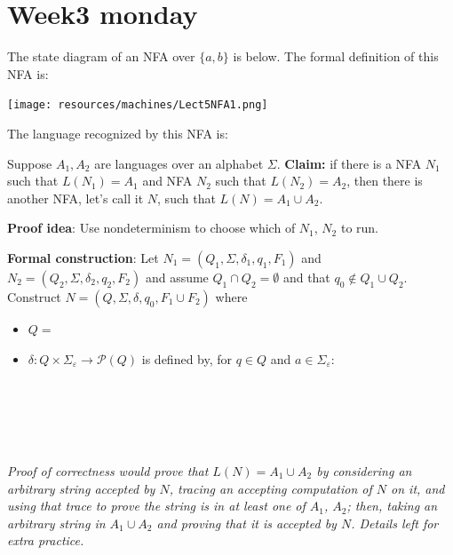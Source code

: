 \documentclass[12pt, oneside]{article}
\begin{document}
\begin{flushright}
\end{flushright} \section*{Week3 monday}


The state diagram of an NFA over $\{a,b\}$ is below.  The formal definition of this NFA is:

\texttt{[image: resources/machines/Lect5NFA1.png]}

The language recognized by this NFA is: 



Suppose $A_1, A_2$ are languages over an alphabet $\Sigma$.
{\bf Claim:} if there is a NFA $N_1$ such that $L(N_1) = A_1$ and 
NFA $N_2$ such that $L(N_2) = A_2$, then there is another NFA, let's call it $N$, such that 
$L(N) = A_1 \cup A_2$.

{\bf Proof idea}: Use nondeterminism to choose which of $N_1$, $N_2$ to run.


{\bf Formal construction}: Let 
$N_1 = (Q_1, \Sigma, \delta_1, q_1, F_1)$ and $N_2 = (Q_2, \Sigma, \delta_2,q_2, F_2)$
and assume $Q_1 \cap Q_2 = \emptyset$ and that $q_0 \notin Q_1 \cup Q_2$.
Construct $N = (Q, \Sigma, \delta, q_0, F_1 \cup F_2)$ where
\begin{itemize}
    \item $Q = $
    \item $\delta: Q \times \Sigma_\varepsilon \to \mathcal{P}(Q)$ is defined by, for $q \in Q$ and $a \in \Sigma_{\varepsilon}$:
        \[
            \phantom{\delta((q,a))=\begin{cases}  \delta_1 ((q,a)) &\qquad\text{if } q\in Q_1 \\ \delta_2 ((q,a)) &\qquad\text{if } q\in Q_2 \\ \{q1,q2\} &\qquad\text{if } q = q_0, a = \varepsilon \\ \emptyset\text{if } q= q_0, a \neq \varepsilon \end{cases}}
        \]
\end{itemize}


\vfill
{\it Proof of correctness would prove that $L(N) = A_1 \cup A_2$ by considering
an arbitrary string accepted by $N$, tracing an accepting computation of $N$ on it, and using 
that trace to prove the string is in at least one of $A_1$, $A_2$; then, taking an arbitrary 
string in $A_1 \cup A_2$ and proving that it is accepted by $N$. Details left for extra practice.}
\end{document}
